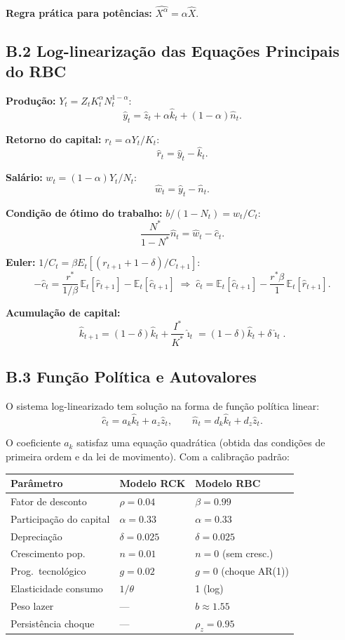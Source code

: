 \documentclass[12pt, a4paper]{article}
\newcommand{\E}{\mathbb{E}}
\begin{document}
\textbf{Regra prática para potências:} $\widehat{X^\alpha} = \alpha\hat{X}$.

\subsection*{B.2 Log-linearização das Equações Principais do RBC}

\textbf{Produção:} $Y_t = Z_t K_t^\alpha N_t^{1-\alpha}$:
\[
\hat{y}_t = \hat{z}_t + \alpha\hat{k}_t + (1-\alpha)\hat{n}_t.
\]

\textbf{Retorno do capital:} $r_t = \alpha Y_t/K_t$:
\[
\hat{r}_t = \hat{y}_t - \hat{k}_t.
\]

\textbf{Salário:} $w_t = (1-\alpha)Y_t/N_t$:
\[
\hat{w}_t = \hat{y}_t - \hat{n}_t.
\]

\textbf{Condição de ótimo do trabalho:} $b/(1-N_t) = w_t/C_t$:
\[
\frac{N^*}{1-N^*}\hat{n}_t = \hat{w}_t - \hat{c}_t.
\]

\textbf{Euler:} $1/C_t = \beta E_t[(r_{t+1}+1-\delta)/C_{t+1}]$:
\[
-\hat{c}_t = \frac{r^*}{1/\beta}\,\E_t[\hat{r}_{t+1}] - \E_t[\hat{c}_{t+1}] \;\Longrightarrow\; \hat{c}_t = \E_t[\hat{c}_{t+1}] - \frac{r^*\beta}{1}\,\E_t[\hat{r}_{t+1}].
\]

\textbf{Acumulação de capital:}
\[
\hat{k}_{t+1} = (1-\delta)\hat{k}_t + \frac{I^*}{K^*}\hat{\imath}_t = (1-\delta)\hat{k}_t + \delta\hat{\imath}_t.
\]

\subsection*{B.3 Função Política e Autovalores}

O sistema log-linearizado tem solução na forma de função política linear:
\[
\hat{c}_t = a_k\hat{k}_t + a_z\hat{z}_t, \qquad \hat{n}_t = d_k\hat{k}_t + d_z\hat{z}_t.
\]

O coeficiente $a_k$ satisfaz uma equação quadrática (obtida das condições de primeira ordem e da lei de movimento). Com a calibração padrão:

\begin{center}
\begin{tabular}{lll}
\toprule
Parâmetro & Modelo RCK & Modelo RBC \\
\midrule
Fator de desconto & $\rho = 0.04$ & $\beta = 0.99$ \\
Participação do capital & $\alpha = 0.33$ & $\alpha = 0.33$ \\
Depreciação & $\delta = 0.025$ & $\delta = 0.025$ \\
Crescimento pop.\ & $n = 0.01$ & $n = 0$ (sem cresc.) \\
Prog.\ tecnológico & $g = 0.02$ & $g = 0$ (choque AR(1)) \\
Elasticidade consumo & $1/\theta$ & 1 (log) \\
Peso lazer & --- & $b \approx 1.55$ \\
Persistência choque & --- & $\rho_z = 0.95$ \\
\bottomrule
\end{tabular}
\end{center}
\end{document}
